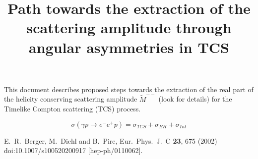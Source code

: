 \documentclass[letterpaper,12pt]{article}
\title{Path towards the extraction of the scattering amplitude through angular asymmetries in TCS}
\def \rarr {\rightarrow}
\begin{document}
 
 \maketitle
 
 This document describes proposed steps towards the extraction of the real part of the helicity conserving scattering amplitude $\tilde{M}^{--}$ (look \cite{Berger:2001xd} for details) for the Timelike Compton scattering (TCS) process.
 
 
 \begin{equation}
 \sigma(\gamma p \rarr e^{-}e^{+}p) = \sigma_{TCS} + \sigma_{BH} + \sigma_{Int}
 \end{equation}

 
 \begin{thebibliography}{100}
  E.~R.~Berger, M.~Diehl and B.~Pire,
  Eur.\ Phys.\ J.\ C {\bf 23}, 675 (2002)
  doi:10.1007/s100520200917
  [hep-ph/0110062].
 \end{thebibliography}

 
\end{document}
